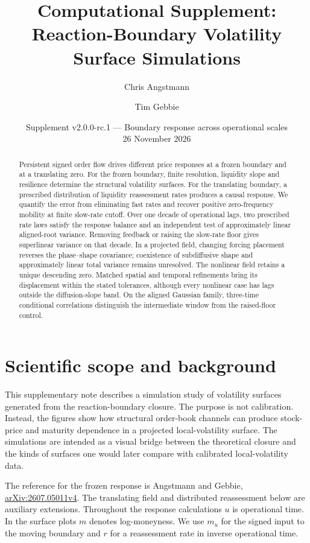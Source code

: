 \documentclass[11pt]{article}
\title{Computational Supplement:\\Reaction-Boundary Volatility Surface Simulations}
\author{Chris Angstmann \and Tim Gebbie}
\date{Supplement v2.0.0-rc.1 --- Boundary response across operational scales\\26 November 2026}
\begin{document}
\maketitle

\begin{abstract}
Persistent signed order flow drives different price responses at a frozen boundary and at a translating zero. For the frozen boundary, finite resolution, liquidity slope and resilience determine the structural volatility surfaces. For the translating boundary, a prescribed distribution of liquidity reassessment rates produces a causal response. We quantify the error from eliminating fast rates and recover positive zero-frequency mobility at finite slow-rate cutoff. Over one decade of operational lags, two prescribed rate laws satisfy the response balance and an independent test of approximately linear aligned-root variance. Removing feedback or raising the slow-rate floor gives superlinear variance on that decade. In a projected field, changing forcing placement reverses the phase--shape covariance; coexistence of subdiffusive shape and approximately linear total variance remains unresolved. The nonlinear field retains a unique descending zero. Matched spatial and temporal refinements bring its displacement within the stated tolerances, although every nonlinear case has lags outside the diffusion-slope band. On the aligned Gaussian family, three-time conditional correlations distinguish the intermediate window from the raised-floor control.
\end{abstract}
\tableofcontents

\section{Scientific scope and background}

This supplementary note describes a simulation study of volatility surfaces
generated from the reaction-boundary closure. The purpose is not calibration.
Instead, the figures show how structural order-book channels can produce
stock-price and maturity dependence in a projected local-volatility surface.
The simulations are intended as a visual bridge between the theoretical
closure and the kinds of surfaces one would later compare with calibrated
local-volatility data.

The reference for the frozen response is Angstmann and Gebbie,
\href{https://arxiv.org/abs/2607.05011v4}{arXiv:2607.05011v4}.
The translating field and distributed reassessment below are auxiliary
extensions. Throughout the response calculations \(u\) is operational
time. In the surface plots \(m\) denotes log-moneyness. We use \(m_u\)
for the signed input to the moving boundary and \(r\) for a reassessment
rate in inverse operational time.
\end{document}
